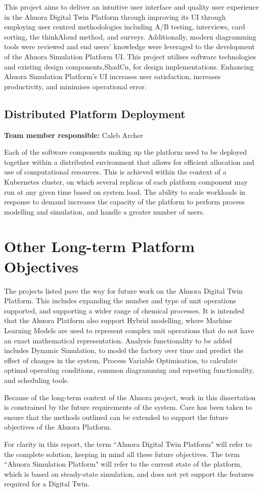 This project aims to deliver an intuitive user interface and quality user experience in the Ahuora Digital Twin Platform through improving its UI through employing user centred methodologies including A/B testing, interviews, card sorting, the thinkAloud method, and surveys. Additionally, modern diagramming tools were reviewed and end users' knowledge were leveraged to the development of the Ahuora Simulation Platform UI. This project utilises software technologies and existing design components,ShadCn, for design implementations. Enhancing Ahuora Simulation Platform's UI increases user satisfaction, increases productivity, and minimises operational error.  

\subsection{Distributed Platform Deployment}

\textbf{Team member responsible:} Caleb Archer

Each of the software components making up the platform need to be deployed together within a distributed environment that allows for efficient allocation and use of computational resources. This is achieved within the context of a Kubernetes cluster, on which several replicas of each platform component may run at any given time based on system load. The ability to scale workloads in response to demand increases the capacity of the platform to perform process modelling and simulation, and handle a greater number of users.

\section{Other Long-term Platform Objectives}

The projects listed pave the way for future work on the Ahuora Digital Twin Platform. This includes expanding the number and type of unit operations supported, and supporting a wider range of chemical processes. It is intended that the Ahuora Platform also support Hybrid modelling, where Machine Learning Models are used to represent complex unit operations that do not have an exact mathematical representation. Analysis functionality to be added includes Dynamic Simulation, to model the factory over time and predict the effect of changes in the system, Process Variable Optimisation, to calculate optimal operating conditions, common diagramming and reporting functionality, and scheduling tools.

Because of the long-term context of the Ahuora project, work in this dissertation is constrained by the future requirements of the system. Care has been taken to ensure that the methods outlined can be extended to support the future objectives of the Ahuora Platform. 

For clarity in this report, the term ``Ahuora Digital Twin Platform" will refer to the complete solution, keeping in mind all these future objectives. The term ``Ahuora Simulation Platform" will refer to the current state of the platform, which is based on steady-state simulation, and does not yet support the features required for a Digital Twin.